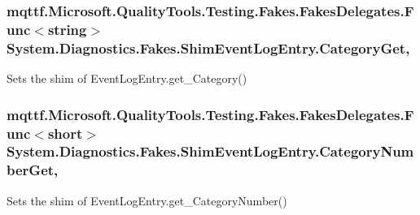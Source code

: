 \hypertarget{class_system_1_1_diagnostics_1_1_fakes_1_1_shim_event_log_entry_ac059a13509fceb3655e0731e4b492466}{
\subsubsection[{Category\-Get}]{\setlength{\rightskip}{0pt plus 5cm}mqttf.\-Microsoft.\-Quality\-Tools.\-Testing.\-Fakes.\-Fakes\-Delegates.\-Func$<$string$>$ System.\-Diagnostics.\-Fakes.\-Shim\-Event\-Log\-Entry.\-Category\-Get\hspace{0.3cm}{\ttfamily [get]}, {\ttfamily [set]}}}\label{class_system_1_1_diagnostics_1_1_fakes_1_1_shim_event_log_entry_ac059a13509fceb3655e0731e4b492466}


Sets the shim of Event\-Log\-Entry.\-get\-\_\-\-Category()

\hypertarget{class_system_1_1_diagnostics_1_1_fakes_1_1_shim_event_log_entry_acba08b6161dc2e9c6ab43d964c9762d1}{
\subsubsection[{Category\-Number\-Get}]{\setlength{\rightskip}{0pt plus 5cm}mqttf.\-Microsoft.\-Quality\-Tools.\-Testing.\-Fakes.\-Fakes\-Delegates.\-Func$<$short$>$ System.\-Diagnostics.\-Fakes.\-Shim\-Event\-Log\-Entry.\-Category\-Number\-Get\hspace{0.3cm}{\ttfamily [get]}, {\ttfamily [set]}}}\label{class_system_1_1_diagnostics_1_1_fakes_1_1_shim_event_log_entry_acba08b6161dc2e9c6ab43d964c9762d1}


Sets the shim of Event\-Log\-Entry.\-get\-\_\-\-Category\-Number()

